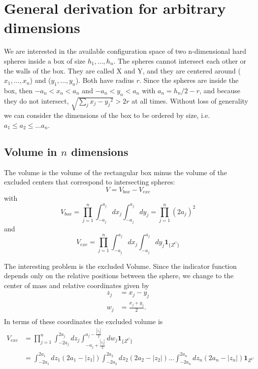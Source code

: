 \documentclass[superscriptaddress,pre,reprint,showpacs,twocolumn]{revtex4-1}
\newcommand{\indicatorsymbol}{\mathbf{1}}
\newcommand{\indicator}[1]{\indicatorsymbol_{ \{   #1 \} } }
\begin{document}
\onecolumngrid
\appendix

\section{General derivation for arbitrary dimensions}
\label{app:area_volumeNd}

We are interested in the available configuration space
of two n-dimensional hard spheres inside a box of size $h_1,\ldots,h_n$. The
spheres cannot intersect each other or the walls of the box. They are called
X and Y, and they are
centered around ($x_1,\ldots,x_n$) and ($y_1,\ldots,y_n$). Both have radius $r$.
Since the spheres are inside the box,
then $-a_n<x_n<a_n$ and $-a_n<y_n<a_n$ with $a_n = h_n/2 - r$, and
because they do not intersect, $\sqrt{\sum_j {x_j - y_j}^2}>2r$ at all times.
Without loss of generality we can consider the dimensions of the box to
be ordered by size, i.e. $a_1 \leq a_2 \leq \ldots a_n$.

\subsection{Volume in $n$ dimensions}\label{app:volumend}

The volume is the volume of the rectangular box minus the
volume of the excluded centers that correspond to intersecting spheres:
\begin{equation}
V = V_{box} - V_{exc}
\end{equation}
with
\begin{equation}
V_{box} =  \prod_{j=1}^n \int_{-a_j}^{a_j} dx_j \int_{-a_j}^{a_j}  dy_j = \prod_{j=1}^n (2 a_j)^2 
\end{equation}
and
\begin{equation}
V_{exc} =  \prod_{j=1}^n \int_{-a_j}^{a_j} dx_j \int_{-a_j}^{a_j}  dy_j  \indicator{Z^C}
\end{equation}

The interesting problem is the excluded Volume. 
Since the indicator function depends only on the relative positions between the sphere,
we change to the center of mass and relative coordinates given by
\begin{align*}
z_j & = x_j -y_j \\
w_j & = \frac{x_j +y_j}{2} .\\
  \end{align*}
In terms of these coordinates the excluded volume is 
\begin{align}
V_{exc} & =  \prod_{j=1}^n \int_{-2a_j}^{2a_j} dz_j \int_{-a_j + \frac{|z_j|}{2}}^{a_j - \frac{|z_j|}{2}}  dw_j  \indicator{Z^C} \\
& = \int_{-2a_1}^{2a_1} dz_1 (2a_1 -|z_1|) \int_{-2a_2}^{2a_2} dz_2 (2a_2 - |z_2|)  \ldots \int_{-2a_n}^{2a_n} dz_n (2a_n - |z_n|)  \mathbf{1}_{Z^C} 
\end{align}
 
\end{document}
